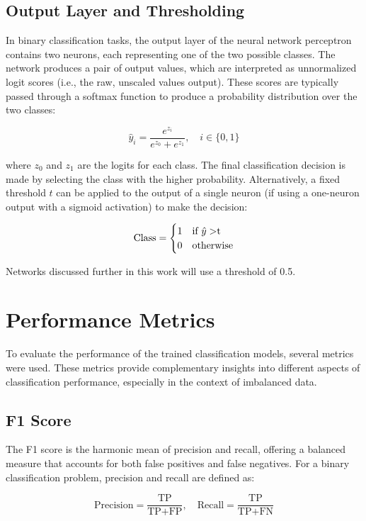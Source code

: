 \documentclass{pracalicmgr}
\begin{document}
\subsection{Output Layer and Thresholding}

In binary classification tasks, the output layer of the neural network perceptron contains two neurons, each representing one of the two possible classes. The network produces a pair of output values, which are interpreted as unnormalized logit scores (i.e., the raw, unscaled values output). These scores are typically passed through a softmax function to produce a probability distribution over the two classes:

\[
\hat{y}_i = \frac{e^{z_i}}{e^{z_0} + e^{z_1}}, \quad i \in \{0, 1\}
\]

where \( z_0 \) and \( z_1 \) are the logits for each class. The final classification decision is made by selecting the class with the higher probability. Alternatively, a fixed threshold $t$ can be applied to the output of a single neuron (if using a one-neuron output with a sigmoid activation) to make the decision:

\[
\text{Class} = 
\begin{cases}
1 & \text{if } \hat{y} > $t$ \\
0 & \text{otherwise}
\end{cases}
\]

Networks discussed further in this work will use a threshold of 0.5.

\section{Performance Metrics}

To evaluate the performance of the trained classification models, several metrics were used. These metrics provide complementary insights into different aspects of classification performance, especially in the context of imbalanced data.

\subsection{F1 Score}

The F1 score is the harmonic mean of precision and recall, offering a balanced measure that accounts for both false positives and false negatives. For a binary classification problem, precision and recall are defined as:

\[
\text{Precision} = \frac{\text{TP}}{\text{TP} + \text{FP}}, \quad
\text{Recall} = \frac{\text{TP}}{\text{TP} + \text{FN}}
\]
\end{document}
